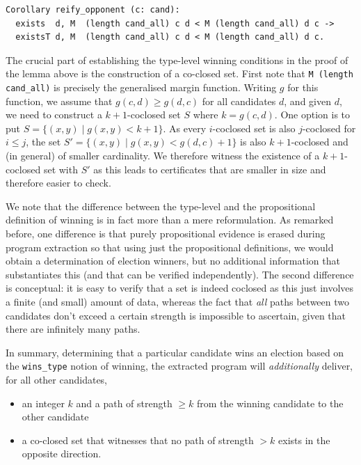 \begin{verbatim}
Corollary reify_opponent (c: cand):
  exists  d, M  (length cand_all) c d < M (length cand_all) d c ->
  existsT d, M  (length cand_all) c d < M (length cand_all) d c.
\end{verbatim}



\noindent
The crucial part of establishing the type-level winning conditions
in the proof of the lemma above is the construction of a co-closed set. 
First note that \texttt{M (length cand\_all)} is precisely
the generalised margin function. Writing $g$ for this function, we
assume that $g(c, d) \geq g(d, c)$ for all candidates $d$, and given
$d$, we need to construct a $k+1$-coclosed set $S$ where $k = g(c, d)$.
One option is to put
$S = \lbrace (x, y) \mid g(x, y) < k+1 \rbrace$. As every
$i$-coclosed set is also $j$-coclosed for $i \leq j$, the set $S' =
\lbrace (x, y) \mid g(x, y) < g(d, c) + 1 \rbrace$ is also
$k+1$-coclosed and (in general) of smaller cardinality. We therefore
witness the existence of a $k+1$-coclosed set with $S'$ as this
leads to certificates that are smaller in size and therefore easier
to check.

We note that the difference between the type-level and the
propositional definition of winning 
is in fact more than a mere reformulation. As remarked before, one
difference is that purely propositional evidence is erased during
program extraction so that using just the propositional definitions,
we would obtain a determination of election winners, but no
additional information that substantiates this (and that can be
verified independently). The second difference is conceptual: it is
easy to verify that a set is indeed coclosed as this just involves a
finite (and small) amount of data, whereas the fact that \emph{all} paths
between two candidates don't exceed a certain strength is impossible
to ascertain, given that there are infinitely many paths.

In summary, determining that a particular candidate wins an election
based on the \texttt{wins\_type} notion of winning, the extracted
program will \emph{additionally} deliver, for all other candidates,
\begin{itemize}
\item an integer $k$ and a path of strength $\geq k$ from the winning candidate to the
other candidate 
\item a co-closed set that witnesses that no path of strength $>k$
exists in the opposite direction.
\end{itemize}

